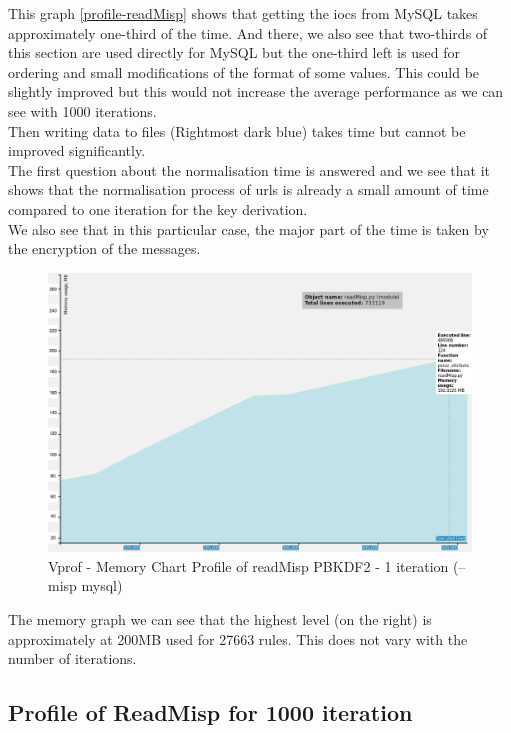 \documentclass{eplmastersthesis}
\begin{document}
This graph \ref{profile-readMisp} shows that getting the \gls{ioc}s from MySQL takes approximately one-third of the time. And there, we also see that two-thirds of this section are used directly for MySQL but the one-third left is used for ordering and small modifications of the format of some values. This could be slightly improved but this would not increase the average performance as we can see with 1000 iterations.\\
Then writing data to files (Rightmost dark blue) takes time but cannot be improved significantly.\\  
The first question about the normalisation time is answered and we see that it shows that the normalisation process of \gls{url}s is already a small amount of time compared to one iteration for the key derivation.\\
We also see that in this particular case, the major part of the time is taken by the encryption of the messages.

\begin{figure}[h!]
\begin{center}
	\includegraphics[scale=0.3]{res/profile-mem-readMisp-1iter}
	\caption{Vprof - Memory Chart Profile of readMisp PBKDF2 - 1 iteration (--misp mysql)}
	\label{profile-mem-readMisp}
\end{center}
\end{figure}

The memory graph we can see that the highest level (on the right) is approximately at 200MB used for 27663 rules. This does not vary with the number of iterations.\\ 

\subsection{Profile of ReadMisp for 1000 iteration}
\end{document}
